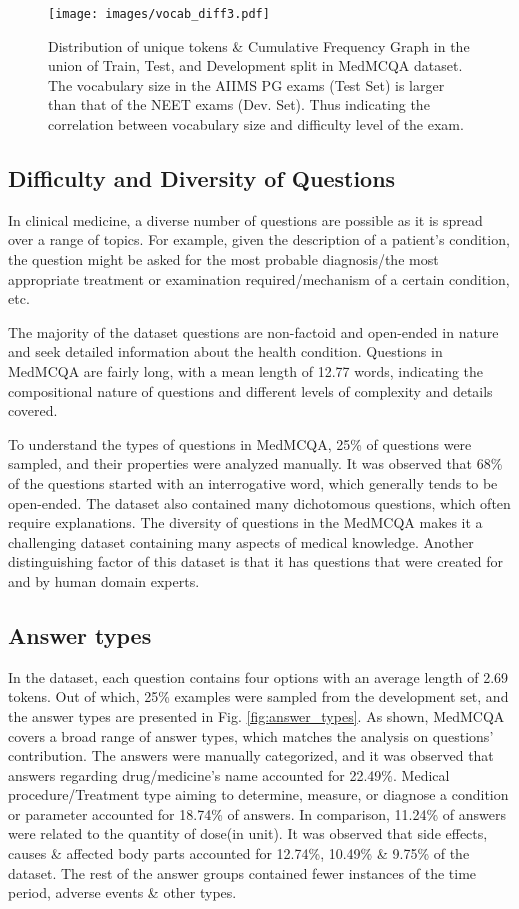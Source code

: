 \documentclass[pmlr,twocolumn,10pt]{jmlr}
\begin{document}
\begin{figure*}[!ht]
  \texttt{[image: images/vocab\_diff3.pdf]}
  \caption{ \footnotesize Distribution of unique tokens \& Cumulative Frequency Graph in the union of Train, Test, and Development split in MedMCQA dataset. The vocabulary size in the AIIMS PG exams (Test Set) is larger than that of the NEET exams (Dev. Set). Thus indicating the correlation between vocabulary size and difficulty level of the exam. 
}
  \label{fig:token_dist}
\end{figure*}

\subsection{Difficulty and Diversity of Questions}
In clinical medicine, a diverse number of questions are possible as it is spread over a range of topics. For example, given the description of a patient's condition, the question might be asked for the most probable diagnosis/the most appropriate treatment or examination required/mechanism of a certain condition, etc.


The majority of the dataset questions are non-factoid and open-ended in nature and seek detailed
information about the health condition. Questions in MedMCQA are fairly long, with a mean length of 12.77 words, indicating the compositional nature of questions and different levels of complexity and details covered.

To understand the types of questions in MedMCQA,  25\% of questions were sampled, and their properties were analyzed manually. It was observed that 68\% of the questions started with an interrogative word, which generally tends to be open-ended. The dataset also contained many dichotomous questions, which often require explanations. The diversity of questions in the MedMCQA makes it a challenging dataset containing many aspects of medical knowledge. Another distinguishing factor of this dataset is that it has questions that were created for and by human domain experts.



\subsection{Answer types}
In the dataset, each question contains four options with an average length of 2.69 tokens. Out of which, 25\% examples were sampled from the development set, and the answer types are presented in Fig. \ref{fig:answer_types}. As shown, MedMCQA covers a broad range of answer types, which matches the analysis on questions' contribution.
The answers were manually categorized, and it was observed that answers regarding drug/medicine's name accounted for 22.49\%. Medical procedure/Treatment type aiming to determine, measure, or diagnose a condition or parameter accounted for 18.74\% of answers. In comparison, 11.24\% of answers were related to the quantity of dose(in unit). It was observed that side effects, causes \& affected body parts accounted for 12.74\%, 10.49\% \& 9.75\% of the dataset. The rest of the answer groups contained fewer instances of the time period, adverse events \& other types.
\end{document}
